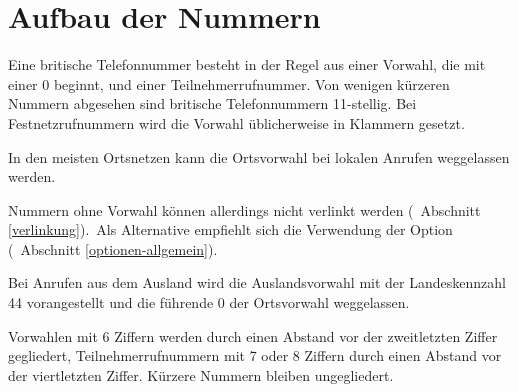 \documentclass[numbers=noenddot]{scrreprt}
\newcommand{\UeberschriftAufbau}{\section{Aufbau der Nummern}}
\newcommand{\KeineVerlinkung}{Nummern ohne Vorwahl können allerdings nicht verlinkt werden
\vglAbschnitt{verlinkung}.}
\newcommand*{\vglAbschnitt}[1]{(\cf\ Abschnitt \ref{#1})}
\newcommand*{\AufbauDEATD}[1]{Bei Anrufen aus dem Ausland wird die Auslandsvorwahl mit der Landeskennzahl #1 vorangestellt und die führende 0 der Ortsvorwahl weggelassen.}
\begin{document}
\UeberschriftAufbau
Eine britische Telefonnummer besteht in der Regel aus einer Vorwahl, die mit einer 0 beginnt, und einer Teilnehmerrufnummer. Von wenigen kürzeren Nummern abgesehen sind britische Telefonnummern 11-stellig. Bei Festnetzrufnummern wird die Vorwahl üblicherweise in Klammern gesetzt.
\begin{sidebyside}
\end{sidebyside}

In den meisten Ortsnetzen kann die Ortsvorwahl bei lokalen Anrufen weggelassen werden.
\begin{sidebyside}
\end{sidebyside}
\KeineVerlinkung\ Als Alternative empfiehlt sich die Verwendung der Option 
\vglAbschnitt{optionen-allgemein}.

\AufbauDEATD{44}
\begin{sidebyside}
\end{sidebyside}

Vorwahlen mit 6 Ziffern werden durch einen Abstand vor der zweitletzten Ziffer gegliedert, Teilnehmerrufnummern mit 7 oder 8 Ziffern durch einen Abstand vor der viertletzten Ziffer. Kürzere Nummern bleiben ungegliedert.
\begin{sidebyside}
   \\
   \\
\end{sidebyside}
\end{document}
